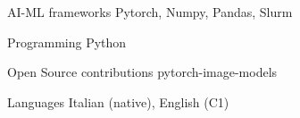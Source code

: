 

\begin{cvskills}

  \cvskill
    {AI-ML frameworks} %
    {Pytorch, Numpy, Pandas, Slurm} %

  \cvskill
    {Programming} %
    {Python} %
  
  \cvskill
    {Open Source contributions} %
    {pytorch-image-models} %

  \cvskill
    {Languages} %
    {Italian (native), English (C1)} %

\end{cvskills}
